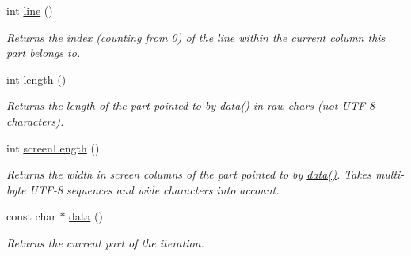 \begin{DoxyCompactItemize}
\mbox{\label{classoption_1_1_print_usage_implementation_1_1_line_part_iterator_a8ad1201d95bf0bd9453a731da8c15a10}} 
int \hyperlink{classoption_1_1_print_usage_implementation_1_1_line_part_iterator_a8ad1201d95bf0bd9453a731da8c15a10}{line} ()
\begin{DoxyCompactList}\small\item\em Returns the index (counting from 0) of the line within the current column this part belongs to. \end{DoxyCompactList}\item 
\mbox{\label{classoption_1_1_print_usage_implementation_1_1_line_part_iterator_a557e521cb41e951a34df2737d25f9dce}} 
int \hyperlink{classoption_1_1_print_usage_implementation_1_1_line_part_iterator_a557e521cb41e951a34df2737d25f9dce}{length} ()
\begin{DoxyCompactList}\small\item\em Returns the length of the part pointed to by \hyperlink{classoption_1_1_print_usage_implementation_1_1_line_part_iterator_ada26229add63bd479c7877f2f8e32908}{data()} in raw chars (not U\+T\+F-\/8 characters). \end{DoxyCompactList}\item 
\mbox{\label{classoption_1_1_print_usage_implementation_1_1_line_part_iterator_a03b6fedfe805d7fc73216da5cd33270e}} 
int \hyperlink{classoption_1_1_print_usage_implementation_1_1_line_part_iterator_a03b6fedfe805d7fc73216da5cd33270e}{screen\+Length} ()
\begin{DoxyCompactList}\small\item\em Returns the width in screen columns of the part pointed to by \hyperlink{classoption_1_1_print_usage_implementation_1_1_line_part_iterator_ada26229add63bd479c7877f2f8e32908}{data()}. Takes multi-\/byte U\+T\+F-\/8 sequences and wide characters into account. \end{DoxyCompactList}\item 
\mbox{\label{classoption_1_1_print_usage_implementation_1_1_line_part_iterator_ada26229add63bd479c7877f2f8e32908}} 
const char $\ast$ \hyperlink{classoption_1_1_print_usage_implementation_1_1_line_part_iterator_ada26229add63bd479c7877f2f8e32908}{data} ()
\begin{DoxyCompactList}\small\item\em Returns the current part of the iteration. \end{DoxyCompactList}\end{DoxyCompactItemize}


